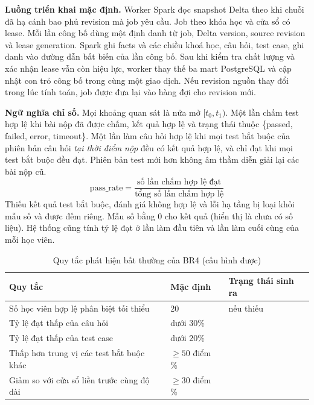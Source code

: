 \textbf{Luồng triển khai mặc định.} Worker Spark đọc snapshot Delta theo  khi chuỗi đã hạ cánh bao phủ revision mà job yêu cầu. Job theo khóa học và cửa sổ có lease. Mỗi lần công bố dùng một định danh từ job, Delta version, source revision và lease generation. Spark ghi facts và các chiều khoá học, câu hỏi, test case, ghi danh vào đường dẫn bất biến của lần công bố. Sau khi kiểm tra chất lượng và xác nhận lease vẫn còn hiệu lực, worker thay thế ba mart PostgreSQL và cập nhật con trỏ công bố trong cùng một giao dịch. Nếu revision nguồn thay đổi trong lúc tính toán, job được đưa lại vào hàng đợi cho revision mới.

\textbf{Ngữ nghĩa chỉ số.} Mọi khoảng quan sát là nửa mở $[t_0, t_1)$. Một lần chấm test hợp lệ khi bài nộp đã được chấm, kết quả hợp lệ và trạng thái thuộc \{passed, failed, error, timeout\}. Một lần làm câu hỏi hợp lệ khi mọi test bắt buộc của phiên bản câu hỏi \emph{tại thời điểm nộp} đều có kết quả hợp lệ, và chỉ đạt khi mọi test bắt buộc đều đạt. Phiên bản test mới hơn không âm thầm diễn giải lại các bài nộp cũ.
\[
  \text{pass\_rate} = \frac{\text{số lần chấm hợp lệ đạt}}{\text{tổng số lần chấm hợp lệ}}
\]
Thiếu kết quả test bắt buộc, đánh giá không hợp lệ và lỗi hạ tầng bị loại khỏi mẫu số và được đếm riêng. Mẫu số bằng 0 cho kết quả  (hiển thị là chưa có số liệu). Hệ thống cũng tính tỷ lệ đạt ở lần làm đầu tiên và lần làm cuối cùng của mỗi học viên.

\begin{table}[H]
\centering\small
\caption{Quy tắc phát hiện bất thường của BR4 (cấu hình được)}\label{tab:br4-rules}
\begin{tabularx}{\textwidth}{@{}YL{2.4cm}L{5.0cm}@{}}
\toprule
\textbf{Quy tắc} & \textbf{Mặc định} & \textbf{Trạng thái sinh ra} \\
\midrule
Số học viên hợp lệ phân biệt tối thiểu & 20 &  nếu thiếu \\
Tỷ lệ đạt thấp của câu hỏi & dưới 30\% &  \\
Tỷ lệ đạt thấp của test case & dưới 20\% &  \\
Thấp hơn trung vị các test bắt buộc khác & $\ge 50$ điểm \% &  \\
Giảm so với cửa sổ liền trước cùng độ dài & $\ge 30$ điểm \% &  \\
\bottomrule
\end{tabularx}
\end{table}

